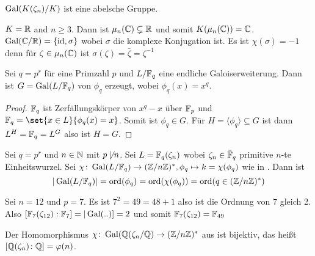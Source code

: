 \begin{Kor}
    \(\operatorname{Gal}(K(\zeta_n)/K)\) ist eine abelsche Gruppe.
\end{Kor}
\begin{Bsp}
    \(K=\mathbb{R}\) and \(n\geq 3\). Dann ist \(\mu_n(\mathbb{C})\subsetneq\mathbb{R}\) und somit \(K(\mu_n(\mathbb{C}))=\mathbb{C}\).
    \(\operatorname{Gal}(\mathbb{C}/\mathbb{R})=\{\mathrm{id},\sigma\}\) wobei \(\sigma\) die komplexe Konjugation ist. Es ist \(\chi(\sigma)=-1\) denn
    für \(\zeta\in\mu_n(\mathbb{C})\) ist \(\sigma(\zeta)=\bar\zeta=\zeta^{-1}\)
\end{Bsp}
\begin{Satz}
    Sei \(q=p^r\) für eine Primzahl \(p\) und \(L/\mathbb{F}_q\) eine endliche Galoiserweiterung. Dann ist \(G=\operatorname{Gal}(L/\mathbb{F}_q)\) von \(\phi_q\) erzeugt, wobei \(\phi_q(x)=x^q\).
\end{Satz}
\begin{proof}
    \(\mathbb{F}_q\) ist Zerfällungskörper von \(x^q-x\) über \(\mathbb{F}_p\) und
    \(\FF_q=\set{x\in L}{ \phi_q(x)=x}\). Somit ist \(\phi_q\in G\).
    Für \(H=\langle \phi_q\rangle\subseteq G\) ist 
    dann \(L^H=\mathbb{F}_q=L^G\) also ist \(H=G\).
\end{proof}
\begin{Kor}
    Sei \(q=p^r\) und \(n\in\mathbb{N}\) mit \(p\not\mid n\). Sei \(L=\mathbb{F}_q(\zeta_n)\) wobei \(\zeta_n\in\bar {\mathbb{F}}_q\) primitive \(n\)-te Einheitswurzel.
    Sei \(\chi\colon \operatorname{Gal}(L/\mathbb{F}_q)\to (\mathbb{Z}/n\mathbb{Z})^*, \phi_q\mapsto k=\chi(\phi_q)\) wie in . Dann ist
    \[|\operatorname{Gal}(L/\mathbb{F}_q)|=\operatorname{ord}(\phi_q)=\operatorname{ord}(\chi(\phi_q))=\operatorname{ord}(q\in(\mathbb{Z}/n\mathbb{Z})^*)\]
\end{Kor}
\begin{Bsp}
  Sei \(n=12\) und \(p=7\). Es ist \(7^2=49 =48+1\) also ist die Ordnung von \(7\) gleich 2.
    Also \([\mathbb{F}_7(\zeta_{12}):\mathbb{F}_7]=|\operatorname{Gal}(..)]=2\) und somit \(\mathbb{F}_7(\zeta_{12})=\mathbb{F}_{49}\)
\end{Bsp}
\begin{Satz}
    Der Homomorphismus \(\chi\colon\operatorname{Gal}(\mathbb{Q}(\zeta_n/\mathbb{Q})\to(\mathbb{Z}/n\mathbb{Z})^*\) aus  ist bijektiv, das heißt \([\mathbb{Q}(\zeta_n)\colon \mathbb{Q}]=\varphi(n)\).
\end{Satz}
